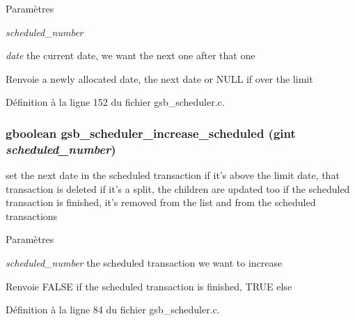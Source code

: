 \begin{DoxyParams}{Paramètres}
\item[{\em scheduled\_\-number}]\item[{\em date}]the current date, we want the next one after that one\end{DoxyParams}
\begin{DoxyReturn}{Renvoie}
a newly allocated date, the next date or NULL if over the limit 
\end{DoxyReturn}


Définition à la ligne 152 du fichier gsb\_\-scheduler.c.

\subsubsection[{gsb\_\-scheduler\_\-increase\_\-scheduled}]{\setlength{\rightskip}{0pt plus 5cm}gboolean gsb\_\-scheduler\_\-increase\_\-scheduled (gint {\em scheduled\_\-number})}\label{gsb__scheduler_8h_a835bf4208d739a5332dbfbf4f7ae066e}
set the next date in the scheduled transaction if it's above the limit date, that transaction is deleted if it's a split, the children are updated too if the scheduled transaction is finished, it's removed from the list and from the scheduled transactions


\begin{DoxyParams}{Paramètres}
\item[{\em scheduled\_\-number}]the scheduled transaction we want to increase\end{DoxyParams}
\begin{DoxyReturn}{Renvoie}
FALSE if the scheduled transaction is finished, TRUE else 
\end{DoxyReturn}


Définition à la ligne 84 du fichier gsb\_\-scheduler.c.

